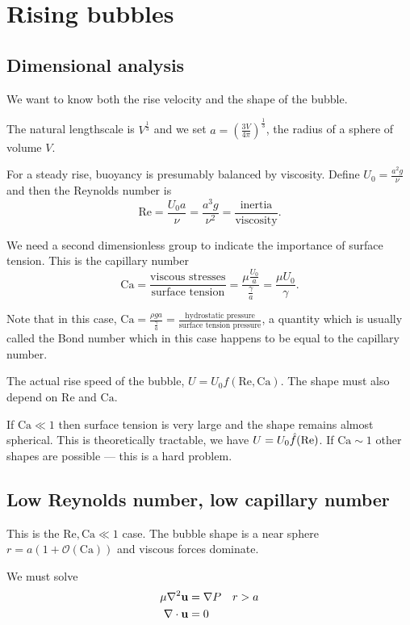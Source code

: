 \documentclass{notes}
\newcommand{\cO}{\mathcal{O}}
\newcommand{\Rey}{\mathrm{Re}}
\newcommand{\Ca}{\mathrm{Ca}}
\theoremstyle{plain}
\begin{document}
\chapter{Rising bubbles}

\section{Dimensional analysis}

\vspace{1in}

We want to know both the rise velocity and the shape of the bubble.

The natural lengthscale is $V^{\frac{1}{3}}$ and we set
$a = \left( \frac{3 V}{4 \pi} \right)^{\frac{1}{3}}$, the radius of
a sphere of volume $V$.

For a steady rise, buoyancy is presumably balanced by viscosity.  Define
$U_0 = \frac{a^2 g}{\nu}$ and then the Reynolds number is
\[
\Rey = \frac{U_0 a}{\nu} = \frac{a^3 g}{\nu^2} = \frac{\text{inertia}}
{\text{viscosity}}.
\]

We need a second dimensionless group to indicate the importance of
surface tension.  This is the capillary number
\[
\Ca = \frac{\text{viscous stresses}}{\text{surface tension}}
= \frac{ \mu \frac{U_0}{a}}{\frac{\gamma}{a}} = \frac{\mu U_0}{\gamma}.
\]

Note that in this case, $\Ca = \frac{\rho g a}{\frac{\gamma}{a}} =
\frac{\text{hydrostatic pressure}}{\text{surface tension pressure}}$,
a quantity which is usually called the Bond number which in this case
happens to be equal to the capillary number.

The actual rise speed of the bubble, $U = U_0 f(\Rey,\Ca)$.  The shape
must also depend on $\Rey$ and $\Ca$.

If $\Ca \ll 1$ then surface tension is very large and the shape remains
almost spherical.  This is theoretically tractable, we have
$U = U_0 \Hat{f}(\Rey)$.  If $\Ca \sim 1$ other shapes are possible --- this
is a hard problem.

\section{Low Reynolds number, low capillary number}

This is the $\Rey, \Ca \ll 1$ case.  The bubble shape is a near
sphere $r = a \left( 1+ \cO(\Ca)\right)$ and viscous forces dominate.

We must solve
\begin{align*}
\mu \nabla^2 \mathbf{u} &= \nabla P \quad r > a \\
\nabla \cdot \mathbf{u} &= 0 
\end{align*}
\end{document}
